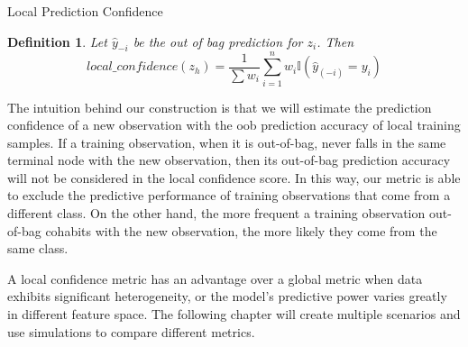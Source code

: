 \documentclass[12pt]{pom_thesis}
\newtheorem{definition}{Definition}[section]
\begin{document}
\begin{chapter}{Local Prediction Confidence}
\begin{definition}
Let $\hat{y}_{-i}$ be the out of bag prediction for $z_i$. Then
     \begin{equation}
     \label{local}
         local\_confidence(z_h) = \frac{1}{\sum w_i}\sum_{i=1}^{n} w_i \mathbb{I}(\hat{y}_{(-i)}=y_i)
     \end{equation}  
\end{definition}


The intuition behind our construction is that we will estimate the prediction confidence of a new observation with the oob prediction accuracy of local training samples. If a training observation, when it is out-of-bag, never falls in the same terminal node with the new observation, then its out-of-bag prediction accuracy will not be considered in the local confidence score. In this way, our metric is able to exclude the predictive performance of training observations that come from a different class. On the other hand, the more frequent a training observation out-of-bag cohabits with the new observation, the more likely they come from the same class.

A local confidence metric has an advantage over a global metric when data exhibits significant heterogeneity, or the model's predictive power varies greatly in different feature space. The following chapter will create multiple scenarios and use simulations to compare different metrics.
\end{chapter}
\end{document}
